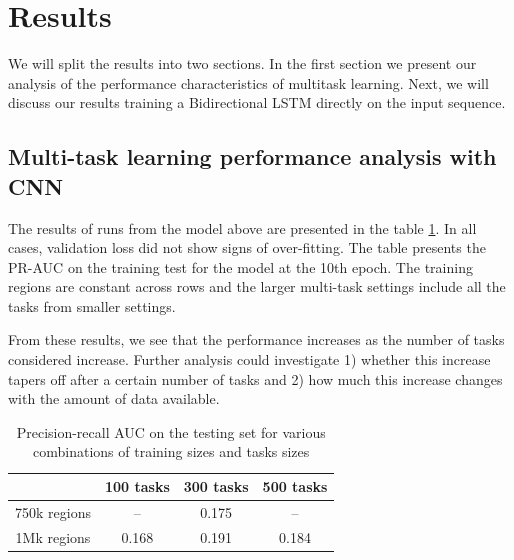 \documentclass{article}
\begin{document}

\section{Results}
We will split the results into two sections. In the first section we present our analysis of the performance characteristics of multitask learning.  Next, we will discuss our results training a Bidirectional LSTM directly on the input sequence.

\subsection{Multi-task learning performance analysis with CNN}

The results of runs from the model above are presented in the table \ref{tab:PR_Multitask}. In all cases, validation loss did not show signs of over-fitting. The table presents the PR-AUC on the training test for the model at the 10th epoch. The training regions are constant across rows and the larger multi-task settings include all the tasks from smaller settings.

From these results, we see that the performance increases as the number of tasks considered increase. Further analysis could investigate 1) whether this increase tapers off after a certain number of tasks and 2) how much this increase changes with the amount of data available. 

\begin{table}[h]
\begin{center}
\begin{tabular}{ |c|c|c|c| } 
 \hline
  & 100 tasks & 300 tasks & 500 tasks \\
 \hline
 750k regions & -- & 0.175 & -- \\ 
 \hline
 1Mk regions & 0.168 & 0.191 & 0.184 \\ 
 \hline
\end{tabular}
\vspace{6pt}
\caption{Precision-recall AUC on the testing set for various combinations of training sizes and tasks sizes}
\label{tab:PR_Multitask}
\end{center}
\end{table}
\end{document}
